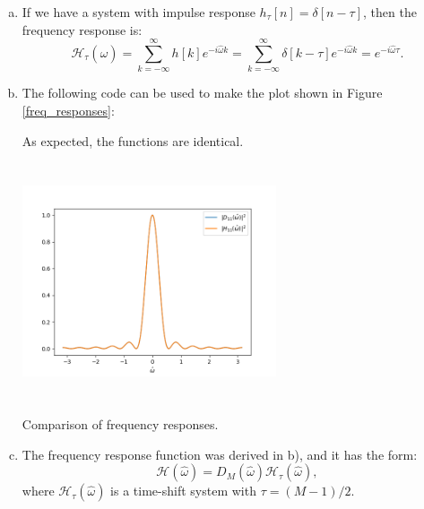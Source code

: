 \begin{enumerate}
\begin{enumerate}[a)]
          \item If we have a system with impulse response $h_{\tau}[n]=\delta[n-\tau]$, then the frequency response is:
                \[ \mathcal{H}_{\tau}(\hat{\omega})=\sum_{k=-\infty}^{\infty}h[k]e^{-i\hat{\omega}k}=\sum_{k=-\infty}^{\infty}\delta[k-\tau]e^{-i\hat{\omega}k}=e^{-i\hat{\omega}\tau}. \]

          \item The following code can be used to make the plot shown in Figure \ref{freq_responses}:
                

                As expected, the functions are identical.
                \begin{marginfigure}
                  \includegraphics[height=7.0cm, width=7.5cm]{ch11/figures/frequency_responses.png}
                  \caption{Comparison of frequency responses.}
                  \label{freq_responses}
                \end{marginfigure}

          \item The frequency response function was derived in b), and it has the form:
                \[ \mathcal{H}(\hat{\omega})=D_{M}(\hat{\omega})\mathcal{H}_{\tau}(\hat{\omega}), \]
                where $\mathcal{H}_{\tau}(\hat{\omega})$ is a time-shift system with $\tau=(M-1)/2$.


\end{enumerate}
\end{enumerate}
